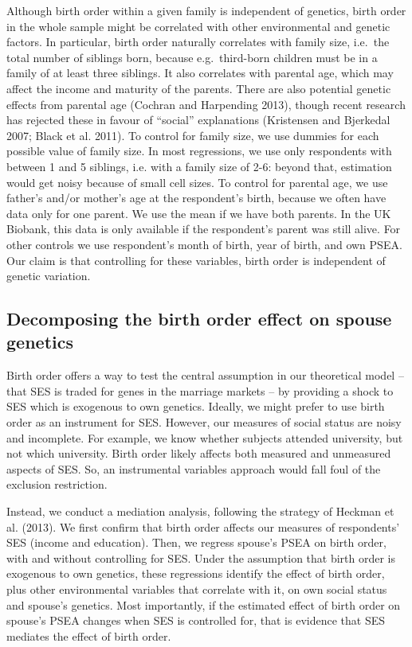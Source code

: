 \documentclass[
  12pt,
]{article}
\theoremstyle{definition}
\theoremstyle{definition}
\theoremstyle{definition}
\theoremstyle{definition}
\theoremstyle{remark}
\begin{document}
Although birth order within a given family is independent of genetics,
birth order in the whole sample might be correlated with other
environmental and genetic factors. In particular, birth order naturally
correlates with family size, i.e.~the total number of siblings born,
because e.g.~third-born children must be in a family of at least three
siblings. It also correlates with parental age, which may affect the
income and maturity of the parents. There are also potential genetic
effects from parental age (Cochran and Harpending 2013), though recent research
has rejected these in favour of ``social'' explanations
(Kristensen and Bjerkedal 2007; Black et al. 2011). To control for family
size, we use dummies for each possible value of family size. In most
regressions, we use only respondents with between 1 and 5 siblings, i.e.
with a family size of 2-6: beyond that, estimation would get noisy
because of small cell sizes. To control for parental age, we use
father's and/or mother's age at the respondent's birth, because we often
have data only for one parent. We use the mean if we have both parents.
In the UK Biobank, this data is only available if the respondent's
parent was still alive. For other controls we use respondent's month of
birth, year of birth, and own PSEA. Our claim is that controlling for
these variables, birth order is independent of genetic variation.

\subsection{Decomposing the birth order effect on spouse genetics}\label{decomposing-the-birth-order-effect-on-spouse-genetics}

Birth order offers a way to test the central assumption in our
theoretical model -- that SES is traded for genes in the marriage
markets -- by providing a shock to SES which is exogenous to own
genetics. Ideally, we might prefer to use birth order as an instrument
for SES. However, our measures of social status are noisy and
incomplete. For example, we know whether subjects attended university,
but not which university. Birth order likely affects both measured and
unmeasured aspects of SES. So, an instrumental variables approach would
fall foul of the exclusion restriction.

Instead, we conduct a mediation analysis, following the strategy of
Heckman et al. (2013). We first confirm that birth order affects our
measures of respondents' SES (income and education). Then, we regress
spouse's PSEA on birth order, with and without controlling for SES.
Under the assumption that birth order is exogenous to own genetics,
these regressions identify the effect of birth order, plus other
environmental variables that correlate with it, on own social status and
spouse's genetics. Most importantly, if the estimated effect of birth
order on spouse's PSEA changes when SES is controlled for, that is
evidence that SES mediates the effect of birth order.
\end{document}
